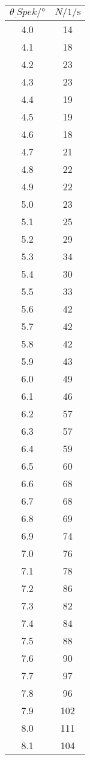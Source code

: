 \label{tab:tabSpektrum}
	\begin{tabular}{S[table-format=2.1]S[table-format=4.0]}
		\toprule
		{$\theta_.{Spek}/\si{\degree}$} & {$N/\si{1\per\second}$} \\
		 &   14 \\
		4.1 &   18 \\
		4.2 &   23 \\
		4.3 &   23 \\
		4.4 &   19 \\
		4.5 &   19 \\
		4.6 &   18 \\
		4.7 &   21 \\
		4.8 &   22 \\
		4.9 &   22 \\
		5.0 &   23 \\
		5.1 &   25 \\
		5.2 &   29 \\
		5.3 &   34 \\
		5.4 &   30 \\
		5.5 &   33 \\
		5.6 &   42 \\
		5.7 &   42 \\
		5.8 &   42 \\
		5.9 &   43 \\
		6.0 &   49 \\
		6.1 &   46 \\
		6.2 &   57 \\
		6.3 &   57 \\
		6.4 &   59 \\
		6.5 &   60 \\
		6.6 &   68 \\
		6.7 &   68 \\
		6.8 &   69 \\
		6.9 &   74 \\
		7.0 &   76 \\
		7.1 &   78 \\
		7.2 &   86 \\
		7.3 &   82 \\
		7.4 &   84 \\
		7.5 &   88 \\
		7.6 &   90 \\
		7.7 &   97 \\
		7.8 &   96 \\
		7.9 &  102 \\
		8.0 &  111 \\
		8.1 &  104 \\

\end{tabular}
